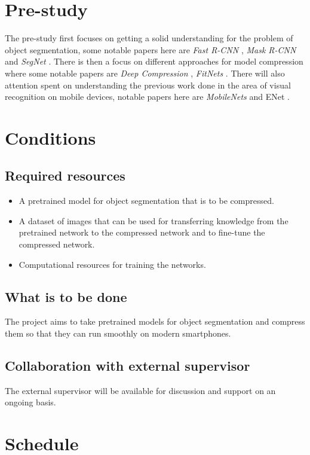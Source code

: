 \documentclass[11pt]{article}
\newcommand{\bibentry}[1]{\cite{#1}}
\begin{document}
\section{Pre-study}
\label{sec:org4989b44}
The pre-study first focuses on getting a solid understanding for the problem of object segmentation, some notable papers here are \emph{Fast R-CNN} \bibentry{girshick2015fast}, \emph{Mask R-CNN} \bibentry{he2017mask} and \emph{SegNet} \bibentry{badrinarayanan2015segnet}.
There is then a focus on different approaches for model compression where some notable papers are \emph{Deep Compression} \bibentry{han2015deep}, \emph{FitNets} \bibentry{romero2014fitnets}.
There will also attention spent on understanding the previous work done in the area of visual recognition on mobile devices, notable papers here are \emph{MobileNets} \bibentry{howard2017mobilenets} and ENet \bibentry{paszke2016enet}. 

\section{Conditions}
\label{sec:org9f2b806}
\subsection{Required resources}
\label{sec:org29015d7}
\begin{itemize}
\item A pretrained model for object segmentation that is to be compressed.
\item A dataset of images that can be used for transferring knowledge from the pretrained network to the compressed network and to fine-tune the compressed network.
\item Computational resources for training the networks.
\end{itemize}
\subsection{What is to be done}
\label{sec:org8729a19}
The project aims to take pretrained models for object segmentation and compress them so that they can run smoothly on modern smartphones.
\subsection{Collaboration with external supervisor}
\label{sec:org7130385}
The external supervisor will be available for discussion and support on an ongoing basis.
\section{Schedule}
\label{sec:orgb6dc1bd}
\end{document}
